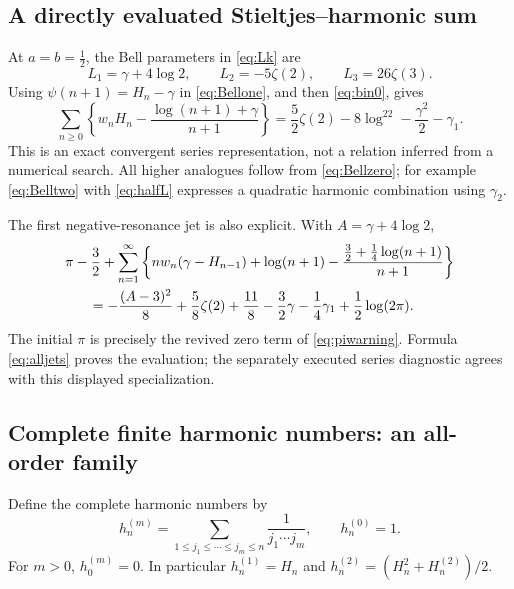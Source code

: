 \subsection{A directly evaluated Stieltjes--harmonic sum}
At $a=b=\tfrac12$, the Bell parameters in \eqref{eq:Lk} are
\begin{equation}\label{eq:halfL}
 L_1=\gamma+4\log2,\qquad L_2=-5\zeta(2),\qquad L_3=26\zeta(3).
\end{equation}
Using $\psi(n+1)=H_n-\gamma$ in \eqref{eq:Bellone}, and then
\eqref{eq:bin0}, gives
\begin{equation}\label{eq:harmonicstieltjes}
 \boxed{\sum_{n\ge0}\left\{
 w_nH_n-\frac{\log(n+1)+\gamma}{n+1}\right\}
 =\frac52\zeta(2)-8\log^22-\frac{\gamma^2}{2}-\gamma_1.}
\end{equation}
This is an exact convergent series representation, not a relation inferred
from a numerical search.  All higher analogues follow from
\eqref{eq:Bellzero}; for example \eqref{eq:Belltwo} with \eqref{eq:halfL}
expresses a quadratic harmonic combination using $\gamma_2$.

The first negative-resonance jet is also explicit.  With
$A=\gamma+4\log2$,
\begin{align}
 &\pi-\frac32+
 \sum_{n=1}^\infty\left\{
 nw_n(\gamma-H_{n-1})+\log(n+1)
 -\frac{\tfrac32+\tfrac14\log(n+1)}{n+1}\right\}\notag\\
 &\hspace{6mm}=-\frac{(A-3)^2}{8}+\frac58\zeta(2)+\frac{11}{8}
 -\frac32\gamma-\frac14\gamma_1+\frac12\log(2\pi).
 \label{eq:firstnegativeexplicit}
\end{align}
The initial $\pi$ is precisely the revived zero term of
\eqref{eq:piwarning}.  Formula \eqref{eq:alljets} proves the evaluation;
the separately executed series diagnostic agrees with this displayed
specialization.

\subsection{Complete finite harmonic numbers: an all-order family}
Define the complete harmonic numbers by
\[
 h_n^{(m)}=\sum_{1\le j_1\le\cdots\le j_m\le n}
                \frac1{j_1\cdots j_m},\qquad h_n^{(0)}=1.
\]
For $m>0$, $h_0^{(m)}=0$.  In particular
$h_n^{(1)}=H_n$ and
$h_n^{(2)}=(H_n^2+H_n^{(2)})/2$.

